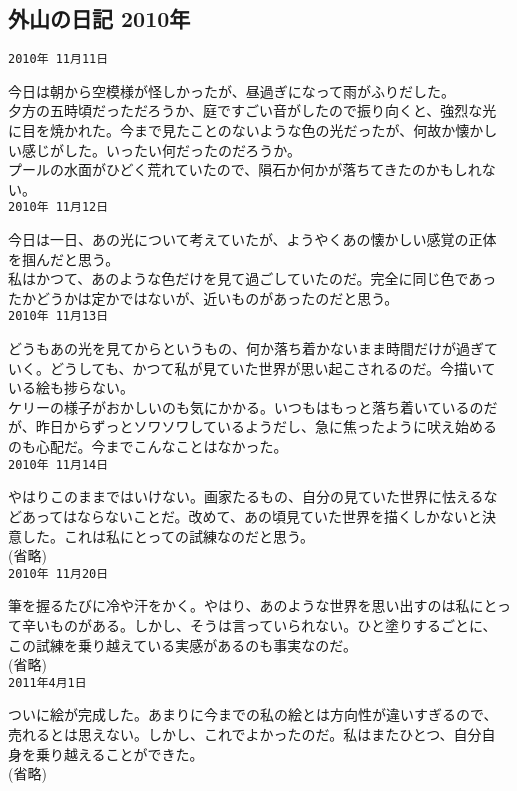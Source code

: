 \documentclass[a4paper,8pt,min]{jsarticle}
\begin{document}
\subsection{外山の日記 2010年}
\begin{screen}
 
 \tt{2010年 11月11日}
 
 今日は朝から空模様が怪しかったが、昼過ぎになって雨がふりだした。\\
 夕方の五時頃だっただろうか、庭ですごい音がしたので振り向くと、強烈な光
 に目を焼かれた。今まで見たことのないような色の光だったが、何故か懐かし
 い感じがした。いったい何だったのだろうか。\\
 プールの水面がひどく荒れていたので、隕石か何かが落ちてきたのかもしれな
 い。\\

 \tt{2010年 11月12日}

 今日は一日、あの光について考えていたが、ようやくあの懐かしい感覚の正体
 を掴んだと思う。\\
 私はかつて、あのような色だけを見て過ごしていたのだ。完全に同じ色であっ
 たかどうかは定かではないが、近いものがあったのだと思う。\\

 \tt{2010年 11月13日}

 どうもあの光を見てからというもの、何か落ち着かないまま時間だけが過ぎて
 いく。どうしても、かつて私が見ていた世界が思い起こされるのだ。今描いて
 いる絵も捗らない。\\
 ケリーの様子がおかしいのも気にかかる。いつもはもっと落ち着いているのだ
 が、昨日からずっとソワソワしているようだし、急に焦ったように吠え始める
 のも心配だ。今までこんなことはなかった。\\

 \tt{2010年 11月14日}

 やはりこのままではいけない。画家たるもの、自分の見ていた世界に怯えるな
 どあってはならないことだ。改めて、あの頃見ていた世界を描くしかないと決
 意した。これは私にとっての試練なのだと思う。\\

 (省略)\\

 \tt{2010年 11月20日}

 筆を握るたびに冷や汗をかく。やはり、あのような世界を思い出すのは私にとっ
 て辛いものがある。しかし、そうは言っていられない。ひと塗りするごとに、
 この試練を乗り越えている実感があるのも事実なのだ。\\

 (省略)\\

 \tt{2011年4月1日}

 ついに絵が完成した。あまりに今までの私の絵とは方向性が違いすぎるので、
 売れるとは思えない。しかし、これでよかったのだ。私はまたひとつ、自分自
 身を乗り越えることができた。\\

 (省略)\\
\end{screen}
\pagestyle{empty}
\newpage
\end{document}
